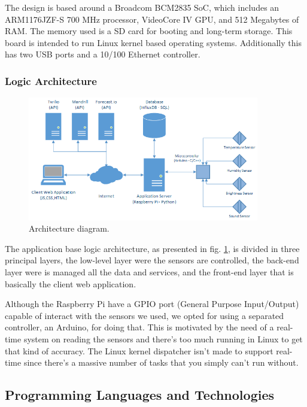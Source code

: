 \documentclass[12pt]{report}
\begin{document}
The design is based around a Broadcom BCM2835 SoC, which includes an ARM1176JZF-S 700 MHz processor, VideoCore IV GPU, and 512 Megabytes of RAM. The memory used is a SD card for booting and long-term storage. This board is intended to run Linux kernel based operating systems. Additionally this has two USB ports and a 10/100 Ethernet controller.

\subsubsection{Logic Architecture}

\begin{figure}[H]
    \centering
    \includegraphics[width=0.9\textwidth]{arc.png}
    \caption{Architecture diagram.}
    \label{fig:arc}
\end{figure}

The application base logic architecture, as presented in fig. \ref{fig:arc}, is divided in three principal layers, the low-level layer were the sensors are controlled, the back-end layer were is managed all the data and services, and the front-end layer that is basically the client web application.

Although the Raspberry Pi have a GPIO port (General Purpose Input/Output) capable of interact with the sensors we used, we opted for using a separated controller, an Arduino, for doing that. This is motivated by the need of a real-time system on reading the sensors and there's too much running in Linux to get that kind of accuracy. The Linux kernel dispatcher isn't made to support real-time since there's a massive number of tasks that you simply can't run without.

\subsection{Programming Languages and Technologies}
\end{document}
